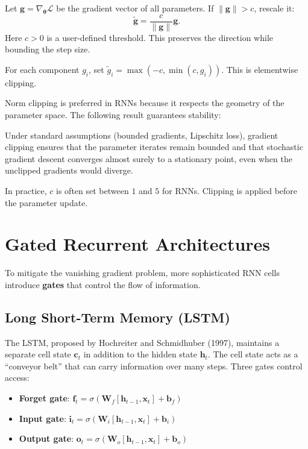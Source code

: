 \documentclass{tufte-handout}
\begin{document}
\begin{defn}
    Let $\mathbf{g} = \nabla_{\boldsymbol{\theta}} \mathcal{L}$ be the gradient vector of all parameters. If $\|\mathbf{g}\| > c$, rescale it:
    \[
    \tilde{\mathbf{g}} = \frac{c}{\|\mathbf{g}\|} \mathbf{g}.
    \]
    Here $c > 0$ is a user-defined threshold. This preserves the direction while bounding the step size.
\end{defn}

\begin{defn}
    For each component $g_i$, set $\tilde{g}_i = \max(-c, \min(c, g_i))$. This is elementwise clipping.
\end{defn}

Norm clipping is preferred in RNNs because it respects the geometry of the parameter space. The following result guarantees stability:

\begin{thm}
    Under standard assumptions (bounded gradients, Lipschitz loss), gradient clipping ensures that the parameter iterates remain bounded and that stochastic gradient descent converges almost surely to a stationary point, even when the unclipped gradients would diverge.
\end{thm}

In practice, $c$ is often set between $1$ and $5$ for RNNs. Clipping is applied before the parameter update.

\section{Gated Recurrent Architectures}

To mitigate the vanishing gradient problem, more sophisticated RNN cells introduce \textbf{gates} that control the flow of information.

\subsection{Long Short-Term Memory (LSTM)}

The LSTM, proposed by Hochreiter and Schmidhuber (1997), maintains a separate cell state $\mathbf{c}_t$ in addition to the hidden state $\mathbf{h}_t$. The cell state acts as a “conveyor belt” that can carry information over many steps. Three gates control access:

\begin{itemize}
    \item \textbf{Forget gate}: $\mathbf{f}_t = \sigma(\mathbf{W}_f [\mathbf{h}_{t-1}, \mathbf{x}_t] + \mathbf{b}_f)$
    \item \textbf{Input gate}: $\mathbf{i}_t = \sigma(\mathbf{W}_i [\mathbf{h}_{t-1}, \mathbf{x}_t] + \mathbf{b}_i)$
    \item \textbf{Output gate}: $\mathbf{o}_t = \sigma(\mathbf{W}_o [\mathbf{h}_{t-1}, \mathbf{x}_t] + \mathbf{b}_o)$
\end{itemize}
\end{document}
